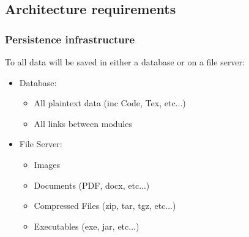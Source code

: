 
\subsection{Architecture requirements}
	\subsubsection{Persistence infrastructure}
		To all data will be saved in either a database or on a file server:
		\begin{itemize}
			\item  Database:
				\begin{itemize}
					\item All plaintext data (inc Code, Tex, etc...)
					\item All links between modules
				\end{itemize}
			\item  File Server:
				\begin{itemize}
					\item Images
					\item Documents (PDF, docx, etc...)
					\item Compressed Files (zip, tar, tgz, etc...)
					\item Executables (exe, jar, etc...)
				\end{itemize}
		\end{itemize}
		
		
